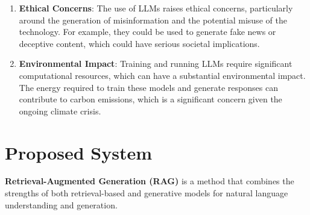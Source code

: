\begin{enumerate}
  \item \textbf{Ethical Concerns}: The use of LLMs raises ethical concerns, particularly around the generation of misinformation and the potential misuse of the technology. For example, they could be used to generate fake news or deceptive content, which could have serious societal implications.
  \item \textbf{Environmental Impact}: Training and running LLMs require significant computational resources, which can have a substantial environmental impact. The energy required to train these models and generate responses can contribute to carbon emissions, which is a significant concern given the ongoing climate crisis.

\end{enumerate}

\section{Proposed System}
\textbf{Retrieval-Augmented Generation (RAG)}\cite{lewis2021retrievalaugmented} is a method that combines the strengths of both retrieval-based and generative models for natural language understanding and generation.

